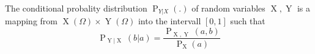 The conditional probality distribution $\operatorname{P}_{Y | X}(.)$ of random variables $\operatorname{X}, \operatorname{Y}$ is a mapping from $\operatorname{X}(\Omega) \times \operatorname{Y}(\Omega)$ into the intervall $[0, 1]$ such that
$$\operatorname{P}_{\operatorname{Y} | \operatorname{X}}(b | a) = \frac{\operatorname{P}_{\operatorname{X},\operatorname{Y}}(a, b)}{\operatorname{P}_{\operatorname{X}}(a)}$$
